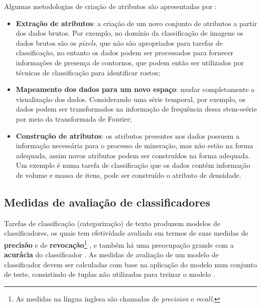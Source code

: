             Algumas metodologias de criação de atributos são apresentadas por :
            \begin{itemize}
                \item \textbf{Extração de atributos}: a criação de um novo conjunto de atributos a partir dos dados brutos.
                Por exemplo, no domínio da classificação de imagens os dados brutos são os \textit{pixels}, que não são apropriados para tarefas de classificação, no entanto os dados podem ser processados para fornecer informações de presença de contornos, que podem então ser utilizados por técnicas de classificação para identificar rostos;
                
                \item \textbf{Mapeamento dos dados para um novo espaço}: mudar completamente a visualização dos dados.
                Considerando uma série temporal, por exemplo, os dados podem ser transformados na informação de frequência dessa stem-seérie por meio da transformada de Fourier;
                
                \item \textbf{Construção de atributos}: os atributos presentes nos dados possuem a informação necessária para o processo de mineração, mas não estão na forma adequada, assim novos atributos podem ser construídos na forma adequada. 
                Um exemplo é numa tarefa de classificação que os dados contém informação de volume e massa de itens, pode ser construído o atributo de densidade.
            \end{itemize}
            
        
    \subsection{Medidas de avaliação de classificadores} \label{subsec:Medidas-de-avaliação-de-classificadores}
        Tarefas de classificação (categorização) de texto produzem modelos de classificadores, os quais tem efetividade avaliada em termos de suas medidas de \textbf{precisão} e de \textbf{revocação}\footnote{As medidas na língua inglesa são chamadas de \textit{precision} e \textit{recall}.} \cite[p.~48]{Berry2010TMAT}, e também há uma preocupação grande com a \textbf{acurácia} do classificador \cite[p.~313]{Zhai2016TDMA}.
        As medidas de avaliação de um modelo de classificador devem ser calculadas com base na aplicação do modelo num conjunto de teste, consistindo de tuplas não utilizadas para treinar o modelo \cite[p.~364]{Han:2011:DMC:1972541}.
        
